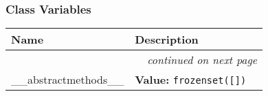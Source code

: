 
  \subsubsection{Class Variables}

    \vspace{-1cm}
\hspace{\varindent}\begin{longtable}{|p{\varnamewidth}|p{\vardescrwidth}|l}
\cline{1-2}
\cline{1-2} \centering \textbf{Name} & \centering \textbf{Description}& \\
\cline{1-2}
\endhead\cline{1-2}\multicolumn{3}{r}{\small\textit{continued on next page}}\\\endfoot\cline{1-2}
\endlastfoot\raggedright \_\-\_\-a\-b\-s\-t\-r\-a\-c\-t\-m\-e\-t\-h\-o\-d\-s\-\_\-\_\- & \raggedright \textbf{Value:} 
{\tt \texttt{frozenset([}\texttt{])}}&\\
\cline{1-2}
\end{longtable}

